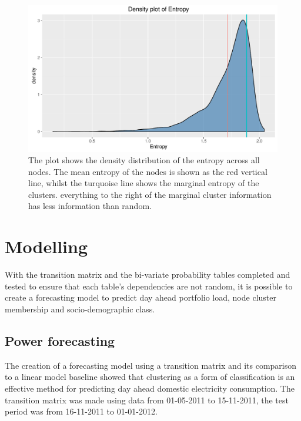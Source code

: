 \begin{figure}[ht]
    \centering
    \includegraphics[width= \textwidth]{Figures/Results/stabilitydens}
    \caption[Entropy density]{The plot shows the density distribution of the entropy across all nodes. The mean entropy of the nodes is shown as the red vertical line, whilst the turquoise line shows the marginal entropy of the clusters. everything to the right of the marginal cluster information has less information than random.}
    \label{fig:stabilitydens}
\end{figure}


\FloatBarrier

\section{Modelling}
With the transition matrix and the bi-variate probability tables completed and tested to ensure that each table's dependencies are not random, it is possible to create a forecasting model to predict day ahead portfolio load, node cluster membership and socio-demographic class. 

\subsection{Power forecasting}
The creation of a forecasting model using a transition matrix and its comparison to a linear model baseline showed that clustering as a form of classification is an effective method for predicting day ahead domestic electricity consumption. The transition matrix was made using data from 01-05-2011 to 15-11-2011, the test period was from 16-11-2011 to 01-01-2012.

